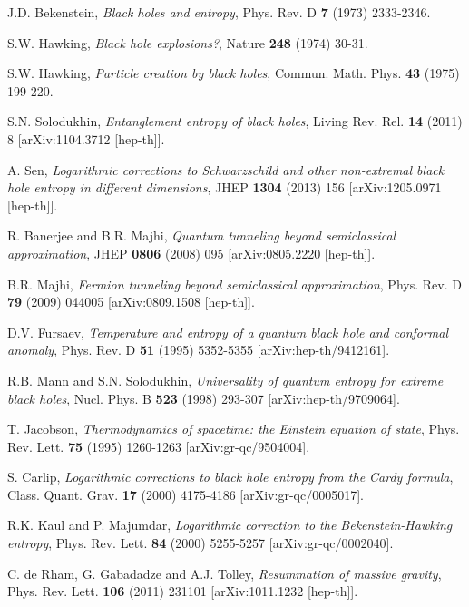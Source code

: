 \documentclass[12pt]{article}
\begin{document}
\begin{thebibliography}{99}

J.D. Bekenstein, \emph{Black holes and entropy}, Phys. Rev. D \textbf{7} (1973) 2333-2346.

S.W. Hawking, \emph{Black hole explosions?}, Nature \textbf{248} (1974) 30-31.

S.W. Hawking, \emph{Particle creation by black holes}, Commun. Math. Phys. \textbf{43} (1975) 199-220.

S.N. Solodukhin, \emph{Entanglement entropy of black holes}, Living Rev. Rel. \textbf{14} (2011) 8 [arXiv:1104.3712 [hep-th]].

A. Sen, \emph{Logarithmic corrections to Schwarzschild and other non-extremal black hole entropy in different dimensions}, JHEP \textbf{1304} (2013) 156 [arXiv:1205.0971 [hep-th]].

R. Banerjee and B.R. Majhi, \emph{Quantum tunneling beyond semiclassical approximation}, JHEP \textbf{0806} (2008) 095 [arXiv:0805.2220 [hep-th]].

B.R. Majhi, \emph{Fermion tunneling beyond semiclassical approximation}, Phys. Rev. D \textbf{79} (2009) 044005 [arXiv:0809.1508 [hep-th]].

D.V. Fursaev, \emph{Temperature and entropy of a quantum black hole and conformal anomaly}, Phys. Rev. D \textbf{51} (1995) 5352-5355 [arXiv:hep-th/9412161].

R.B. Mann and S.N. Solodukhin, \emph{Universality of quantum entropy for extreme black holes}, Nucl. Phys. B \textbf{523} (1998) 293-307 [arXiv:hep-th/9709064].

T. Jacobson, \emph{Thermodynamics of spacetime: the Einstein equation of state}, Phys. Rev. Lett. \textbf{75} (1995) 1260-1263 [arXiv:gr-qc/9504004].

S. Carlip, \emph{Logarithmic corrections to black hole entropy from the Cardy formula}, Class. Quant. Grav. \textbf{17} (2000) 4175-4186 [arXiv:gr-qc/0005017].

R.K. Kaul and P. Majumdar, \emph{Logarithmic correction to the Bekenstein-Hawking entropy}, Phys. Rev. Lett. \textbf{84} (2000) 5255-5257 [arXiv:gr-qc/0002040].

C. de Rham, G. Gabadadze and A.J. Tolley, \emph{Resummation of massive gravity}, Phys. Rev. Lett. \textbf{106} (2011) 231101 [arXiv:1011.1232 [hep-th]].


\end{thebibliography}
\end{document}
